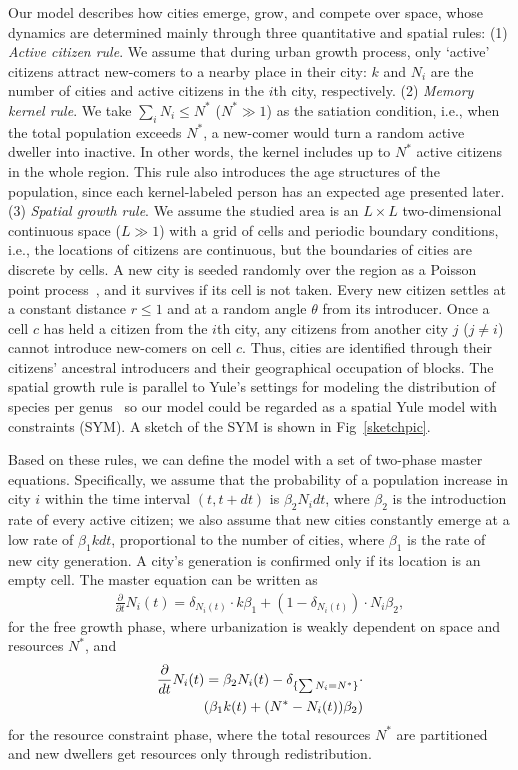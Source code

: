 Our model describes how cities emerge, grow, and compete over space, whose dynamics are determined mainly through three quantitative and spatial rules: (1) \textit{Active citizen rule}. We assume that during urban growth process, only `active' citizens attract new-comers to a nearby place in their city: $k$ and $N_i$ are the number of cities and active citizens in the $i$th city, respectively. (2) \textit{Memory kernel rule}. We take $\sum_{i} N_i \le N^*$ ($N^* \gg 1$) as the satiation condition, i.e., when the total population exceeds $N^*$, a new-comer would turn a random active dweller into inactive. In other words, the kernel includes up to $N^*$ active citizens in the whole region. This rule also introduces the age structures of the population, since each kernel-labeled person has an expected age presented later. (3) \emph{Spatial growth rule}. We assume the studied area is an $L\times L$ two-dimensional continuous space ($L\gg 1$) with a grid of cells and periodic boundary conditions, i.e., the locations of citizens are continuous, but the boundaries of cities are discrete by cells. A new city is seeded randomly over the region as a Poisson point process~\cite{miles1970homogeneous}, and it survives if its cell is not taken. Every new citizen settles at a constant distance $r\le 1$ and at a random angle $\theta$ from its introducer. Once a cell $c$ has held a citizen from the $i$th city, any citizens from another city $j$ ($j\ne i$) cannot introduce new-comers on cell $c$. Thus, cities are identified through their citizens' ancestral introducers and their geographical occupation of blocks. The spatial growth rule is parallel to Yule's settings for modeling the distribution of species per genus~\cite{yule1925ii} so our model could be regarded as a spatial Yule model with constraints (SYM). A sketch of the SYM is shown in Fig~\ref{sketchpic}.

Based on these rules, we can define the model with a set of two-phase master equations. Specifically, we assume that the probability of a population increase in city $i$ within the time interval $(t,t+dt)$ is $\beta_2N_idt$, where $\beta_2$ is the introduction rate of every active citizen; we also assume that new cities constantly emerge at a low rate of $\beta_1kdt$, proportional to the number of cities, where $\beta_1$ is the rate of new city generation. A city's generation is confirmed only if its location is an empty cell. The master equation can be written as \begin{align}\frac{\partial}{\partial t}N_i(t) =  \delta_{N_i(t)}\cdot k\beta_1+ (1-\delta_{N_i(t)})\cdot N_i\beta_2, \end{align} for the free growth phase, where urbanization is weakly dependent on space and resources $N^*$,
and \begin{align}
\frac{\partial}{dt} N_i(t) = \beta_2 N_i(t) -\delta_{\{\sum N_i = N^*\}}\cdot\notag \\ \left(\beta_1k(t) + (N^*-N_i(t))\beta_2 \right)
\end{align}
for the resource constraint phase, where the total resources $N^*$ are partitioned and new dwellers get resources only through redistribution. 


